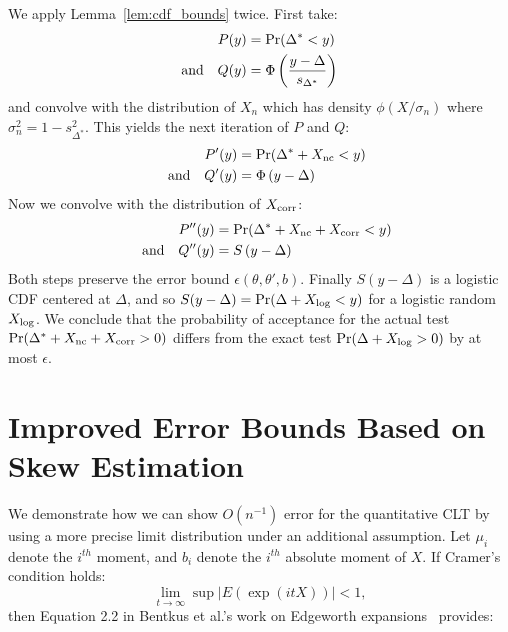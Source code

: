 \documentclass[twoside]{article} \usepackage{aistats2017}
\begin{document}
We apply Lemma~\ref{lem:cdf_bounds} twice. First take:
\begin{equation}
\begin{split}
    P(y) & = {\rm Pr}(\Delta^* < y) \\
     {\rm and} \quad Q(y) & = \Phi\left(\frac{y-\Delta}{s_{\Delta^*}}\right)
\end{split}
\end{equation}
and convolve with the distribution of $X_n$ which has density $\phi(X/\sigma_n)$
where $\sigma_n^2 = 1 - s^2_{\Delta^*}$. This yields the next iteration of $P$
and $Q$:
\begin{equation}
\begin{split}
    P'(y) & = {\rm Pr}(\Delta^*+X_{\rm nc} < y) \\
    \quad {\rm and}\quad Q'(y) & = \Phi\left({y-\Delta}\right)
\end{split}
\end{equation}
Now we convolve with the distribution of $X_{\rm corr}$:
\begin{equation}
\begin{split}
    P''(y) & = {\rm Pr}(\Delta^*+X_{\rm nc}+X_{\rm corr} < y) \\
    \quad {\rm and}\quad Q''(y) & = S\left({y-\Delta}\right)
\end{split}
\end{equation}
Both steps preserve the error bound $\epsilon(\theta,\theta',b)$. Finally
$S(y-\Delta)$ is a logistic CDF centered at $\Delta$, and so $S(y-\Delta) = {\rm
Pr}(\Delta + X_{\rm log} < y)$ for a logistic random $X_{\rm log}$. We conclude
that the probability of acceptance for the actual test ${\rm Pr}(\Delta^*+X_{\rm
nc}+X_{\rm corr} > 0)$ differs from the exact test ${\rm Pr}(\Delta+X_{\rm
log} > 0)$ by at most $\epsilon$.



\section{Improved Error Bounds Based on Skew Estimation}\label{app:better_error_bound}

We demonstrate how we can show $O(n^{-1})$ error for the quantitative CLT by
using a more precise limit distribution under an additional assumption. Let
$\mu_i$ denote the $i^{th}$ moment, and $b_i$ denote the $i^{th}$ absolute
moment of $X$. If Cramer's condition holds:
\begin{equation}\label{eq:cramers_condition}
    \lim_{t \to \infty} \sup |E(\exp(i t X))| < 1,
\end{equation}
then Equation 2.2 in Bentkus et al.'s work on Edgeworth
expansions~\citep{Bentkus97} provides:
\end{document}
